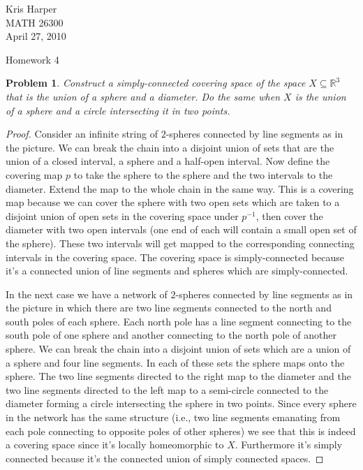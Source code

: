 \documentclass{article}
\newtheorem{problem}{Problem}
\begin{document}
\begin{flushright}
Kris Harper\\

MATH 26300\\

April 27, 2010
\end{flushright}

\begin{center}
Homework 4
\end{center}

\begin{problem}
Construct a simply-connected covering space of the space $X \subseteq \mathbb{R}^3$ that is the union of a sphere and a diameter. Do the same when $X$ is the union of a sphere and a circle intersecting it in two points.
\end{problem}
\begin{proof}
Consider an infinite string of $2$-spheres connected by line segments as in the picture. We can break the chain into a disjoint union of sets that are the union of a closed interval, a sphere and a half-open interval.
\vspace{100pt}
Now define the covering map $p$ to take the sphere to the sphere and the two intervals to the diameter. Extend the map to the whole chain in the same way. This is a covering map because we can cover the sphere with two open sets which are taken to a disjoint union of open sets in the covering space under $p^{-1}$, then cover the diameter with two open intervals (one end of each will contain a small open set of the sphere). These two intervals will get mapped to the corresponding connecting intervals in the covering space. The covering space is simply-connected because it's a connected union of line segments and spheres which are simply-connected.

In the next case we have a network of $2$-spheres connected by line segments as in the picture in which there are two line segments connected to the north and south poles of each sphere. Each north pole has a line segment connecting to the south pole of one sphere and another connecting to the north pole of another sphere. We can break the chain into a disjoint union of sets which are a union of a sphere and four line segments.
\vspace{150pt}
In each of these sets the sphere maps onto the sphere. The two line segments directed to the right map to the diameter and the two line segments directed to the left map to a semi-circle connected to the diameter forming a circle intersecting the sphere in two points. Since every sphere in the network has the same structure (i.e., two line segments emanating from each pole connecting to opposite poles of other spheres) we see that this is indeed a covering space since it's locally homeomorphic to $X$. Furthermore it's simply connected because it's the connected union of simply connected spaces.
\end{proof}
\end{document}
